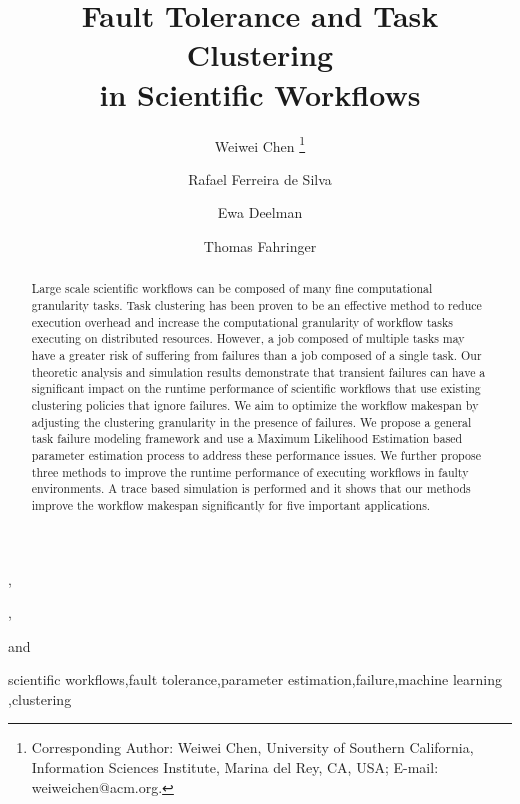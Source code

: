 \documentclass{IOS-Book-Article}
\begin{document}
\begin{frontmatter}              %

\title{Fault Tolerance and Task Clustering\\
 in Scientific Workflows}

\author[A]{{Weiwei} {Chen}%
\thanks{Corresponding Author: Weiwei Chen, University of Southern California, Information Sciences Institute, Marina del Rey, CA, USA; E-mail:
weiweichen@acm.org.}},
\author[A]{Rafael Ferreira de Silva}, 
\author[A]{{Ewa Deelman}}
and 
\author[B]{{Thomas} {Fahringer}}

\address[A]{University of Southern California, Information Sciences Institute, Marina del Rey, CA, USA}
\address[B]{University of Innsbruck, Institute for Computer Science, Innsbruck, Austria}

\begin{abstract}
Large scale scientific workflows can be composed of many fine computational granularity tasks. Task clustering has been proven to be an effective method to reduce execution overhead and increase the computational granularity of workflow tasks executing on distributed resources. However, a job composed of multiple tasks may have a greater risk of suffering from failures than a job composed of a single task. Our theoretic analysis and simulation results demonstrate that transient failures can have a significant impact on the runtime performance of scientific workflows that use existing clustering policies that ignore failures. We aim to optimize the workflow makespan by adjusting the clustering granularity in the presence of failures. We propose a general task failure modeling framework and use a Maximum Likelihood Estimation based parameter estimation process to address these performance issues. We further propose three methods to improve the runtime performance of executing workflows in faulty environments. A trace based simulation is performed and it shows that our methods improve the workflow makespan significantly for five important applications.    
\end{abstract}

\begin{keyword}
scientific workflows\sep fault tolerance\sep parameter estimation\sep failure\sep machine learning \sep clustering
\end{keyword}
\end{frontmatter}
\end{document}
